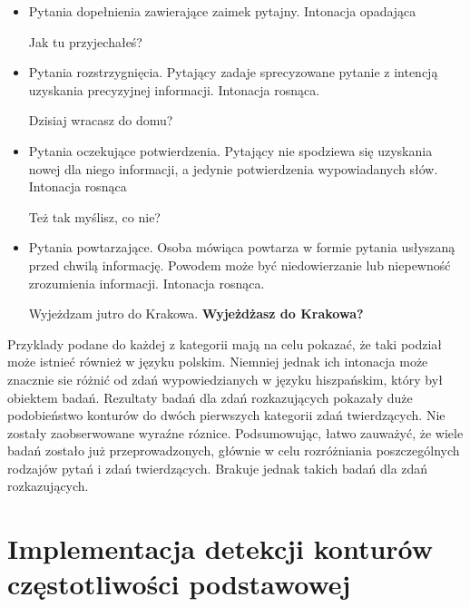\documentclass[a4paper,12 pt]{article}
\begin{document}
\begin{itemize}
\item{Pytania dopełnienia zawierające zaimek pytajny. Intonacja opadająca}
\begin{exe}
\ex Jak tu przyjechałeś?
\end{exe}
\item{Pytania rozstrzygnięcia. Pytający zadaje sprecyzowane pytanie z intencją uzyskania precyzyjnej informacji. Intonacja rosnąca.}
\begin{exe}
\ex Dzisiaj wracasz do domu?
\end{exe}
\item{Pytania oczekujące potwierdzenia. Pytający nie spodziewa się uzyskania nowej dla niego informacji, a jedynie potwierdzenia wypowiadanych słów. Intonacja rosnąca}
\begin{exe}
\ex Też tak myślisz, co nie?
\end{exe}
\item{Pytania powtarzające. Osoba mówiąca powtarza w formie pytania usłyszaną przed chwilą informację. Powodem może być niedowierzanie lub niepewność zrozumienia informacji. Intonacja rosnąca.}
\begin{exe}
\ex Wyjeżdzam jutro do Krakowa.
\newline
\textbf{Wyjeżdżasz do Krakowa?}
\end{exe}
\end{itemize}
Przyklady podane do każdej z kategorii mają na celu pokazać, że taki podział może istnieć również w języku polskim. Niemniej jednak ich intonacja może znacznie sie różnić od zdań wypowiedzianych w języku hiszpańskim, który był obiektem badań. Rezultaty badań dla zdań rozkazujących pokazały duże podobieństwo konturów do dwóch pierwszych kategorii zdań twierdzących. Nie zostały zaobserwowane wyraźne róznice.
\newline
Podsumowując, łatwo zauważyć, że wiele badań zostało już przeprowadzonych, głównie w celu rozróżniania poszczególnych rodzajów pytań i zdań twierdzących. Brakuje jednak takich badań dla zdań rozkazujących.
\newpage
\section{Implementacja detekcji konturów częstotliwości podstawowej}
\end{document}
